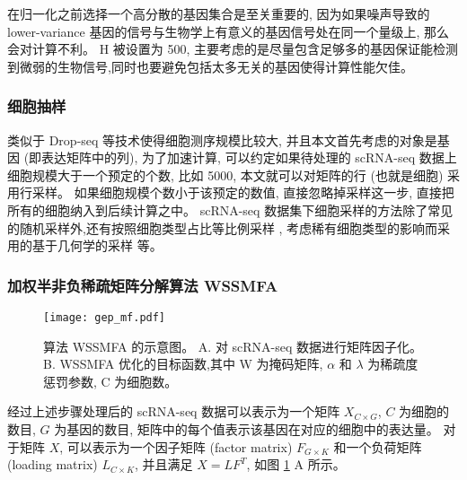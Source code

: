 在归一化之前选择一个高分散的基因集合是至关重要的, 
因为如果噪声导致的 lower-variance 基因的信号与生物学上有意义的基因信号处在同一个量级上, 那么会对计算不利。 
H 被设置为 500, 主要考虑的是尽量包含足够多的基因保证能检测到微弱的生物信号,同时也要避免包括太多无关的基因使得计算性能欠佳。

\subsubsection{细胞抽样}
类似于 Drop-seq 等技术使得细胞测序规模比较大, 并且本文首先考虑的对象是基因 (即表达矩阵中的列), 
为了加速计算, 可以约定如果待处理的 scRNA-seq 数据上细胞规模大于一个预定的个数, 比如 5000,
本文就可以对矩阵的行 (也就是细胞) 采用行采样。
如果细胞规模个数小于该预定的数值, 直接忽略掉采样这一步, 
直接把所有的细胞纳入到后续计算之中。
 scRNA-seq 数据集下细胞采样的方法除了常见的随机采样外,还有按照细胞类型占比等比例采样 ,
考虑稀有细胞类型的影响而采用的基于几何学的采样  等。

\subsubsection{加权半非负稀疏矩阵分解算法 WSSMFA}

\begin{figure}[!htbp]
    \centering
    \texttt{[image: gep\_mf.pdf]}
    \caption{
        算法 WSSMFA 的示意图。
        A. 对 scRNA-seq 数据进行矩阵因子化。
        B. WSSMFA 优化的目标函数,其中 W 为掩码矩阵, $\alpha$ 和 $\lambda$ 为稀疏度惩罚参数, C 为细胞数。
    }
    \label{fig:gep-mf}
\end{figure}

经过上述步骤处理后的 scRNA-seq 数据可以表示为一个矩阵 $X_{C \times G}$, $C$ 为细胞的数目, $G$ 为基因的数目, 
矩阵中的每个值表示该基因在对应的细胞中的表达量。
对于矩阵 $X$, 可以表示为一个因子矩阵 (factor matrix) $F_{G \times K}$ 和一个负荷矩阵 (loading matrix) $L_{C \times K}$,
并且满足 $X=LF^T$, 如图 \ref{fig:gep-mf} A 所示。 


